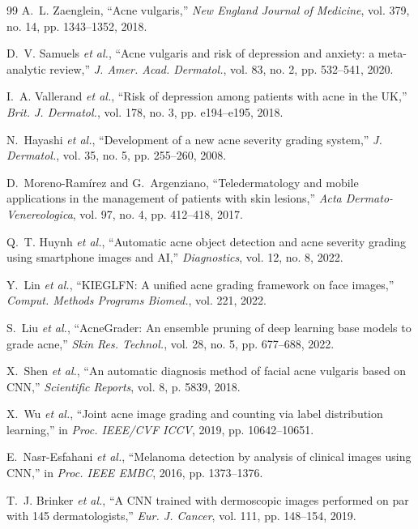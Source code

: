 \documentclass[10pt,conference]{IEEEtran}
\begin{document}
\begin{thebibliography}{99}
A.~L. Zaenglein, ``Acne vulgaris,'' \emph{New England Journal of Medicine}, vol. 379, no. 14, pp. 1343--1352, 2018.

D.~V. Samuels \emph{et al.}, ``Acne vulgaris and risk of depression and anxiety: a meta-analytic review,'' \emph{J. Amer. Acad. Dermatol.}, vol. 83, no. 2, pp. 532--541, 2020.

I.~A. Vallerand \emph{et al.}, ``Risk of depression among patients with acne in the UK,'' \emph{Brit. J. Dermatol.}, vol. 178, no. 3, pp. e194--e195, 2018.

N.~Hayashi \emph{et al.}, ``Development of a new acne severity grading system,'' \emph{J. Dermatol.}, vol. 35, no. 5, pp. 255--260, 2008.

D.~Moreno-Ram{\'i}rez and G.~Argenziano, ``Teledermatology and mobile applications in the management of patients with skin lesions,'' \emph{Acta Dermato-Venereologica}, vol. 97, no. 4, pp. 412--418, 2017.

Q.~T. Huynh \emph{et al.}, ``Automatic acne object detection and acne severity grading using smartphone images and AI,'' \emph{Diagnostics}, vol. 12, no. 8, 2022.

Y.~Lin \emph{et al.}, ``KIEGLFN: A unified acne grading framework on face images,'' \emph{Comput. Methods Programs Biomed.}, vol. 221, 2022.

S.~Liu \emph{et al.}, ``AcneGrader: An ensemble pruning of deep learning base models to grade acne,'' \emph{Skin Res. Technol.}, vol. 28, no. 5, pp. 677--688, 2022.

X.~Shen \emph{et al.}, ``An automatic diagnosis method of facial acne vulgaris based on CNN,'' \emph{Scientific Reports}, vol. 8, p. 5839, 2018.

X.~Wu \emph{et al.}, ``Joint acne image grading and counting via label distribution learning,'' in \emph{Proc. IEEE/CVF ICCV}, 2019, pp. 10642--10651.

E.~Nasr-Esfahani \emph{et al.}, ``Melanoma detection by analysis of clinical images using CNN,'' in \emph{Proc. IEEE EMBC}, 2016, pp. 1373--1376.

T.~J. Brinker \emph{et al.}, ``A CNN trained with dermoscopic images performed on par with 145 dermatologists,'' \emph{Eur. J. Cancer}, vol. 111, pp. 148--154, 2019.


\end{thebibliography}
\end{document}
